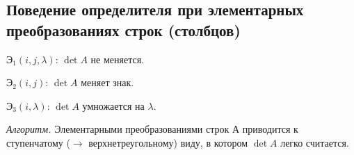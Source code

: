 \subsection{Поведение определителя при элементарных преобразованиях строк (столбцов)}

$\text{Э}_1 (i, j, \lambda)$: $\det A$ не меняется.

$\text{Э}_2 (i, j)$: $\det A$ меняет знак.

$\text{Э}_3 (i, \lambda)$: $\det A$ умножается на $\lambda$.


\bigskip
\textit{Алгоритм.} Элементарными преобразованиями строк А приводится к ступенчатому ($\to$ верхнетреугольному) виду, в котором $\det A$ легко считается.
